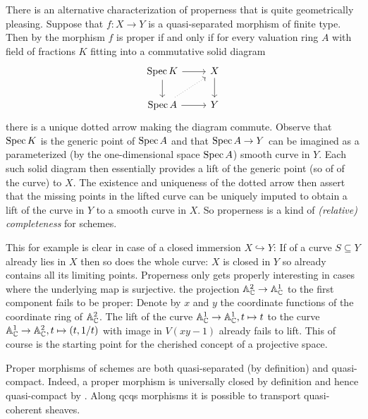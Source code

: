 \begin{example}
	There is an alternative characterization of properness that is quite geometrically pleasing. Suppose that $f\colon X\to Y$ is a quasi-separated morphism of finite type. Then by \cite[\href{https://stacks.math.columbia.edu/tag/0BX4}{Tag 0BX4}]{stacks-project} the morphism $f$ is proper if and only if for every valuation ring $A$ with field of fractions $K$ fitting into a commutative solid diagram
	$$\begin{tikzcd}
		\Spec K \ar[r]\ar[d] &X\ar[d]\\
		\Spec A\ar[r]\ar[ur, dotted] &Y
	\end{tikzcd}$$
	there is a unique dotted arrow making the diagram commute. Observe that $\operatorname{Spec} K$ is the generic point of $\operatorname{Spec} A$ and that $\operatorname{Spec} A\to Y$ can be imagined as a parameterized (by the one-dimensional space $\operatorname{Spec} A$) smooth curve in $Y$. Each such solid diagram then essentially provides a lift of the generic point (so of  of the curve) to $X$. The existence and uniqueness of the dotted arrow then assert that the missing points in the lifted curve can be uniquely imputed to obtain a lift of the curve in $Y$ to a smooth curve in $X$. So properness is a kind of \emph{(relative) completeness} for schemes.
	
	This for example is clear in case of a closed immersion $X\hookrightarrow Y$: If  of a curve $S\subseteq Y$ already lies in $X$ then so does the whole curve: $X$ is closed in $Y$ so already contains all its limiting points. Properness only gets properly interesting in cases where the underlying map is surjective. \Eg the projection ${\mathbb{A}}_{\mathbb{C}}^2\to {\mathbb{A}}_{\mathbb{C}}^1$ to the first component fails to be proper: Denote by $x$ and $y$ the coordinate functions of the coordinate ring of ${\mathbb{A}}^2_{\mathbb{C}}$. The  lift of the curve ${\mathbb{A}}^1_{\mathbb{C}}\to {\mathbb{A}}^1_{\mathbb{C}}, t\mapsto t$ to the curve ${\mathbb{A}}^1_{\mathbb{C}} \to {\mathbb{A}}^2_{\mathbb{C}}, t\mapsto (t, 1/t)$ with image in $V(xy - 1)$ already fails to lift. This of course is the starting point for the cherished concept of a projective space.
\end{example}


Proper morphisms of schemes are both quasi-separated (by definition) and quasi-compact. Indeed, a proper morphism is universally closed by definition and hence quasi-compact by \cite[\href{https://stacks.math.columbia.edu/tag/04XU}{Tag 04XU}]{stacks-project}. Along qcqs morphisms it is possible to transport quasi-coherent sheaves.

